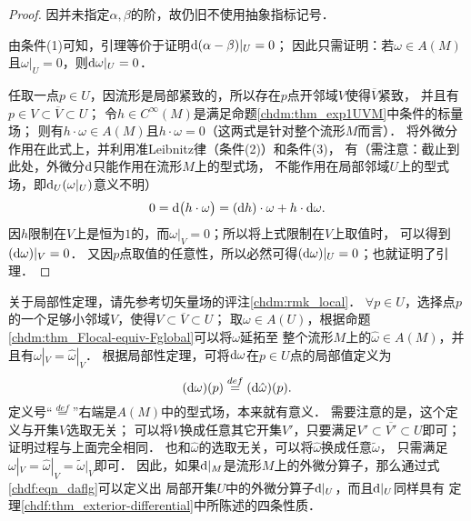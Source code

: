 \begin{proof}
    因并未指定$\alpha,\beta$的阶，故仍旧不使用抽象指标记号．



    由条件(1)可知，引理等价于证明${\rm d}(\alpha-\beta)|_U = 0$；
    因此只需证明：若$\omega \in A(M)$且$\omega|_U=0$，则${\rm d}\omega|_U =0$．

    任取一点$p\in U$，因流形是局部紧致的，所以存在$p$点开邻域$V$使得$\overline{V}$紧致，
    并且有$p \in V \subset \overline{V} \subset U$；
    令$h\in C^\infty(M)$是满足命题\ref{chdm:thm_exp1UVM}中条件的标量场；
    则有$h\cdot \omega \in A(M)$且$ h\cdot \omega =0$（这两式是针对整个流形$M$而言）．
    将外微分作用在此式上，并利用准Leibnitz律（条件(2)）和条件(3)，
    有（需注意：截止到此处，外微分${\rm d}$只能作用在流形$M$上的型式场，
    不能作用在局部邻域$U$上的型式场，即${\rm d}_U (\omega|_U)$意义不明）
    \begin{equation*}
        0={\rm d}\bigl(h\cdot \omega\bigr)=( {\rm d}h ) \cdot \omega + h \cdot {\rm d}\omega.
    \end{equation*}
    因$h$限制在$V$上是恒为$1$的，而$\omega|_V=0$；所以将上式限制在$V$上取值时，
    可以得到$({\rm d}\omega)|_V=0$．
    又因$p$点取值的任意性，所以必然可得$({\rm d}\omega)|_U=0$；也就证明了引理．
\end{proof}


关于局部性定理，请先参考切矢量场的评注\ref{chdm:rmk_local}．
$\forall p\in U$，选择点$p$的一个足够小邻域$V$，使得$V\subset \overline{V} \subset U$；
取$\omega \in A(U)$，根据命题\ref{chdm:thm_Flocal-equiv-Fglobal}可以将$\omega$延拓至
整个流形$M$上的$\hat{\omega}\in A(M)$，并且有$\omega|_V= \hat{\omega}|_V$．
根据局部性定理，可将${\rm d}\omega$在$p\in U$点的局部值定义为
\begin{equation}\label{chdf:eqn_daflg}
    ({\rm d}\omega )(p) \overset{def}{=} ({\rm d}\hat{\omega} )(p) .
\end{equation}
定义号“$\overset{def}{=}$”右端是$A(M)$中的型式场，本来就有意义．
需要注意的是，这个定义与开集$V$选取无关；
可以将$V$换成任意其它开集$V'$，只要满足$V' \subset \overline{V'} \subset U$即可；
证明过程与上面完全相同．
也和$\hat{\omega}$的选取无关，可以将$\hat{\omega}$换成任意$\tilde{\omega}$，
只需满足$\omega|_V=\hat{\omega}|_V=\tilde{\omega}|_V$即可．
因此，如果${\rm d}|_M$是流形$M$上的外微分算子，那么通过式\eqref{chdf:eqn_daflg}可以定义出
局部开集$U$中的外微分算子${\rm d}|_U$，而且${\rm d}|_U$同样具有
定理\ref{chdf:thm_exterior-differential}中所陈述的四条性质．

